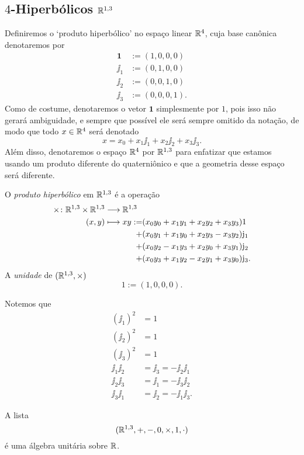 \subsection{$4$-Hiperbólicos \ensuremath{\R^{1,3}}}

Definiremos o `produto hiperbólico' no espaço linear $\mathbb{R}^4$, cuja base canônica denotaremos por
	\begin{align*}
	\bm 1 &:= (1,0,0,0) \\
	\jj_1 &:= (0,1,0,0) \\
	\jj_2 &:= (0,0,1,0) \\
	\jj_3 &:= (0,0,0,1).
	\end{align*}
Como de costume, denotaremos o vetor $\bm 1$ simplesmente por $1$, pois isso não gerará ambiguidade, e sempre que possível ele será sempre omitido da notação, de modo que todo $x \in \mathbb{R}^4$ será denotado
	\begin{equation*}
	x = x_0 + x_1 \jj_1 + x_2 \jj_2 + x_3 \jj_3.
	\end{equation*}
Além disso, denotaremos o espaço $\mathbb{R}^4$ por $\mathbb{R}^{1,3}$ para enfatizar que estamos usando um produto diferente do quaterniônico e que a geometria desse espaço será diferente.

\begin{definition}
O \emph{produto hiperbólico} em $\mathbb{R}^{1,3}$ é a operação
	\begin{align*}
	\func{\htimes}{\R^{1,3} \times \R^{1,3}}{\R^{1,3}}{(x,y)}{
		\begin{aligned}[t]
		xy := &(x_0y_0 + x_1y_1 + x_2y_2 + x_3y_3) 1 \\
			+ &(x_0y_1 + x_1y_0 + x_2y_3 - x_3y_2) \jj_1 \\
			+ &(x_0y_2 - x_1y_3 + x_2y_0 + x_3y_1) \jj_2 \\
			+ &(x_0y_3 + x_1y_2 - x_2y_1 + x_3y_0) \jj_3 .
		\end{aligned}
	}
	\end{align*}
A \emph{unidade} de $(\mathbb{R}^{1,3},\times)$
	\begin{equation*}
	1 := (1,0,0,0).
	\end{equation*}
\end{definition}

Notemos que
	\begin{align*}
	(\jj_1)^2 &= 1 \\
	(\jj_2)^2 &= 1 \\
	(\jj_3)^2 &= 1 \\
	\jj_1\jj_2 &= \jj_3 = -\jj_2\jj_1 \\
	\jj_2\jj_3 &= \jj_1 = -\jj_3\jj_2 \\
	\jj_3\jj_1 &= \jj_2 = -\jj_1\jj_3.
	\end{align*}

\begin{exercise}
A lista
	\begin{equation*}
	(\mathbb{R}^{1,3},+,-,0,\times,1,\cdot)
	\end{equation*}
é uma álgebra unitária sobre $\mathbb{R}$.
\end{exercise}